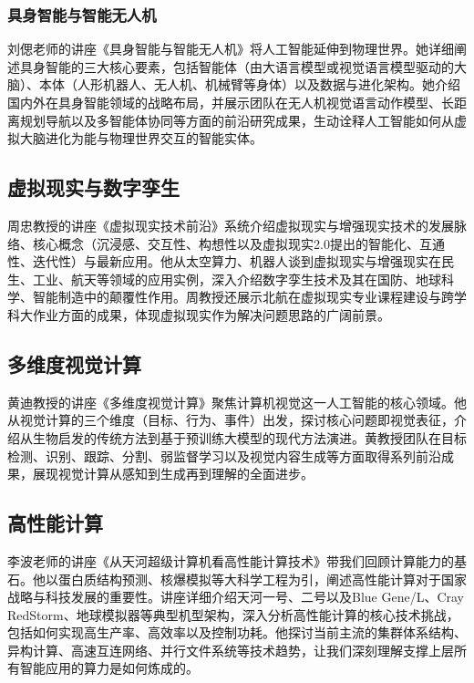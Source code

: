 \documentclass[zihao=-4, linespread=1.5]{ctexart}
\begin{document}
\subsubsection{具身智能与智能无人机}

刘偲老师的讲座《具身智能与智能无人机》将人工智能延伸到物理世界。她详细阐述具身智能的三大核心要素，包括智能体（由大语言模型或视觉语言模型驱动的大脑）、本体（人形机器人、无人机、机械臂等身体）以及数据与进化架构。她介绍国内外在具身智能领域的战略布局，并展示团队在无人机视觉语言动作模型、长距离规划导航以及多智能体协同等方面的前沿研究成果，生动诠释人工智能如何从虚拟大脑进化为能与物理世界交互的智能实体。

\subsection{虚拟现实与数字孪生}

周忠教授的讲座《虚拟现实技术前沿》系统介绍虚拟现实与增强现实技术的发展脉络、核心概念（沉浸感、交互性、构想性以及虚拟现实2.0提出的智能化、互通性、迭代性）与最新应用。他从太空算力、机器人谈到虚拟现实与增强现实在民生、工业、航天等领域的应用实例，深入介绍数字孪生技术及其在国防、地球科学、智能制造中的颠覆性作用。周教授还展示北航在虚拟现实专业课程建设与跨学科大作业方面的成果，体现虚拟现实作为解决问题思路的广阔前景。

\subsection{多维度视觉计算}

黄迪教授的讲座《多维度视觉计算》聚焦计算机视觉这一人工智能的核心领域。他从视觉计算的三个维度（目标、行为、事件）出发，探讨核心问题即视觉表征，介绍从生物启发的传统方法到基于预训练大模型的现代方法演进。黄教授团队在目标检测、识别、跟踪、分割、弱监督学习以及视觉内容生成等方面取得系列前沿成果，展现视觉计算从感知到生成再到理解的全面进步。

\subsection{高性能计算}

李波老师的讲座《从天河超级计算机看高性能计算技术》带我们回顾计算能力的基石。他以蛋白质结构预测、核爆模拟等大科学工程为引，阐述高性能计算对于国家战略与科技发展的重要性。讲座详细介绍天河一号、二号以及Blue Gene/L、Cray RedStorm、地球模拟器等典型机型架构，深入分析高性能计算的核心技术挑战，包括如何实现高生产率、高效率以及控制功耗。他探讨当前主流的集群体系结构、异构计算、高速互连网络、并行文件系统等技术趋势，让我们深刻理解支撑上层所有智能应用的算力是如何炼成的。
\end{document}
